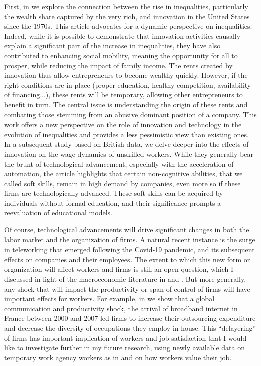 \documentclass[12pt]{article}
\begin{document}
First, in \citet*{aghion2019innovation} we explore the connection between the rise in inequalities, particularly the wealth share captured by the very rich, and innovation in the United States since the 1970s. This article advocates for a dynamic perspective on inequalities. Indeed, while it is possible to demonstrate that innovation activities causally explain a significant part of the increase in inequalities, they have also contributed to enhancing social mobility, meaning the opportunity for all to prosper, while reducing the impact of family income. The rents created by innovation thus allow entrepreneurs to become wealthy quickly. However, if the right conditions are in place (proper education, healthy competition, availability of financing...), these rents will be temporary, allowing other entrepreneurs to benefit in turn. The central issue is understanding the origin of these rents and combating those stemming from an abusive dominant position of a company. This work offers a new perspective on the role of innovation and technology in the evolution of inequalities and provides a less pessimistic view than existing ones. In a subsequent study \citet*{abbg} based on British data, we delve deeper into the effects of innovation on the wage dynamics of unskilled workers. While they generally bear the brunt of technological advancement, especially with the acceleration of automation, the article highlights that certain non-cognitive abilities, that we called soft skills, remain in high demand by companies, even more so if these firms are technologically advanced. These soft skills can be acquired by individuals without formal education, and their significance prompts a reevaluation of educational models.

Of course, technological advancements will drive significant changes in both the labor market and the organization of firms. A natural recent instance is the surge in teleworking that emerged following the Covid-19 pandemic, and its subsequent effects on companies and their employees. The extent to which this new form or organization will affect workers and firms is still an open question, which I discussed in light of the macroeconomic literature in \citet*{bergeaud2020macroeconomics, bergeaud2023teletravail} and \citet*{bergeaud2023working}. But more generally, any shock that will impact the productivity or span of control of firms will have important effects for workers. For example, in \citet*{adsl} we show that a global communication and productivity shock, the arrival of broadband internet in France between 2000 and 2007 led firms to increase their outsourcing expenditure and decrease the diversity of occupations they employ in-house. This ``delayering'' of firms has important implication of workers and job satisfaction that I would like to investigate further in my future research, using newly available data on temporary work agency workers as in \citet*{interim} and on how workers value their job.


\newpage
{}


\end{document}
